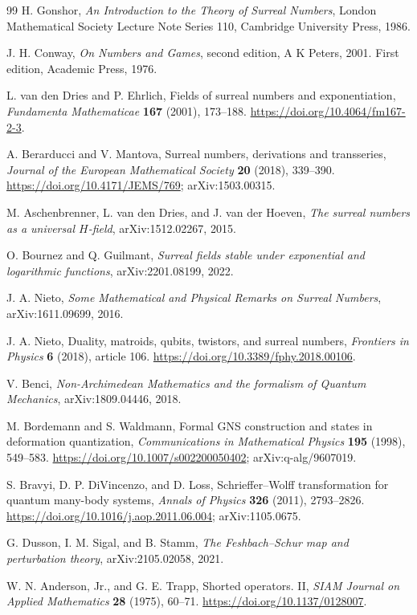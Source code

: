 \documentclass[11pt,oneside]{article}
\numberwithin{equation}{section}
\theoremstyle{plain}
\theoremstyle{definition}
\theoremstyle{remark}
\begin{document}
\begin{thebibliography}{99}
H. Gonshor, \emph{An Introduction to the Theory of Surreal Numbers}, London Mathematical Society Lecture Note Series 110, Cambridge University Press, 1986.

J. H. Conway, \emph{On Numbers and Games}, second edition, A K Peters, 2001. First edition, Academic Press, 1976.

L. van den Dries and P. Ehrlich, Fields of surreal numbers and exponentiation, \emph{Fundamenta Mathematicae} \textbf{167} (2001), 173--188. \url{https://doi.org/10.4064/fm167-2-3}.

A. Berarducci and V. Mantova, Surreal numbers, derivations and transseries, \emph{Journal of the European Mathematical Society} \textbf{20} (2018), 339--390. \url{https://doi.org/10.4171/JEMS/769}; arXiv:1503.00315.

M. Aschenbrenner, L. van den Dries, and J. van der Hoeven, \emph{The surreal numbers as a universal $H$-field}, arXiv:1512.02267, 2015.

O. Bournez and Q. Guilmant, \emph{Surreal fields stable under exponential and logarithmic functions}, arXiv:2201.08199, 2022.

J. A. Nieto, \emph{Some Mathematical and Physical Remarks on Surreal Numbers}, arXiv:1611.09699, 2016.

J. A. Nieto, Duality, matroids, qubits, twistors, and surreal numbers, \emph{Frontiers in Physics} \textbf{6} (2018), article 106. \url{https://doi.org/10.3389/fphy.2018.00106}.

V. Benci, \emph{Non-Archimedean Mathematics and the formalism of Quantum Mechanics}, arXiv:1809.04446, 2018.

M. Bordemann and S. Waldmann, Formal GNS construction and states in deformation quantization, \emph{Communications in Mathematical Physics} \textbf{195} (1998), 549--583. \url{https://doi.org/10.1007/s002200050402}; arXiv:q-alg/9607019.

S. Bravyi, D. P. DiVincenzo, and D. Loss, Schrieffer--Wolff transformation for quantum many-body systems, \emph{Annals of Physics} \textbf{326} (2011), 2793--2826. \url{https://doi.org/10.1016/j.aop.2011.06.004}; arXiv:1105.0675.

G. Dusson, I. M. Sigal, and B. Stamm, \emph{The Feshbach--Schur map and perturbation theory}, arXiv:2105.02058, 2021.

W. N. Anderson, Jr., and G. E. Trapp, Shorted operators. II, \emph{SIAM Journal on Applied Mathematics} \textbf{28} (1975), 60--71. \url{https://doi.org/10.1137/0128007}.


\end{thebibliography}
\end{document}
